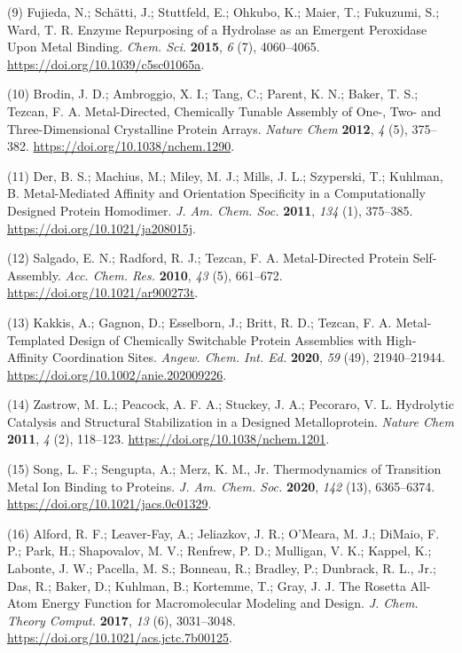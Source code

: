 \documentclass[ lineno,
  9pt]{elife}
\newenvironment{cslreferences}%
  {}%
  {\par}
\begin{document}
\begin{cslreferences}
\leavevmode\hypertarget{ref-78bpCEHk}{}%
(9) Fujieda, N.; Schätti, J.; Stuttfeld, E.; Ohkubo, K.; Maier, T.; Fukuzumi, S.; Ward, T. R. Enzyme Repurposing of a Hydrolase as an Emergent Peroxidase Upon Metal Binding. \emph{Chem. Sci.} \textbf{2015}, \emph{6} (7), 4060--4065. \url{https://doi.org/10.1039/c5sc01065a}.

\leavevmode\hypertarget{ref-ROLANnJl}{}%
(10) Brodin, J. D.; Ambroggio, X. I.; Tang, C.; Parent, K. N.; Baker, T. S.; Tezcan, F. A. Metal-Directed, Chemically Tunable Assembly of One-, Two- and Three-Dimensional Crystalline Protein Arrays. \emph{Nature Chem} \textbf{2012}, \emph{4} (5), 375--382. \url{https://doi.org/10.1038/nchem.1290}.

\leavevmode\hypertarget{ref-Lj2sbjzc}{}%
(11) Der, B. S.; Machius, M.; Miley, M. J.; Mills, J. L.; Szyperski, T.; Kuhlman, B. Metal-Mediated Affinity and Orientation Specificity in a Computationally Designed Protein Homodimer. \emph{J. Am. Chem. Soc.} \textbf{2011}, \emph{134} (1), 375--385. \url{https://doi.org/10.1021/ja208015j}.

\leavevmode\hypertarget{ref-17JMFzNJo}{}%
(12) Salgado, E. N.; Radford, R. J.; Tezcan, F. A. Metal-Directed Protein Self-Assembly. \emph{Acc. Chem. Res.} \textbf{2010}, \emph{43} (5), 661--672. \url{https://doi.org/10.1021/ar900273t}.

\leavevmode\hypertarget{ref-io987fKE}{}%
(13) Kakkis, A.; Gagnon, D.; Esselborn, J.; Britt, R. D.; Tezcan, F. A. Metal‐Templated Design of Chemically Switchable Protein Assemblies with High‐Affinity Coordination Sites. \emph{Angew. Chem. Int. Ed.} \textbf{2020}, \emph{59} (49), 21940--21944. \url{https://doi.org/10.1002/anie.202009226}.

\leavevmode\hypertarget{ref-JXKFLH3I}{}%
(14) Zastrow, M. L.; Peacock, A. F. A.; Stuckey, J. A.; Pecoraro, V. L. Hydrolytic Catalysis and Structural Stabilization in a Designed Metalloprotein. \emph{Nature Chem} \textbf{2011}, \emph{4} (2), 118--123. \url{https://doi.org/10.1038/nchem.1201}.

\leavevmode\hypertarget{ref-1FR3e6DyA}{}%
(15) Song, L. F.; Sengupta, A.; Merz, K. M., Jr. Thermodynamics of Transition Metal Ion Binding to Proteins. \emph{J. Am. Chem. Soc.} \textbf{2020}, \emph{142} (13), 6365--6374. \url{https://doi.org/10.1021/jacs.0c01329}.

\leavevmode\hypertarget{ref-1uPiiMnD}{}%
(16) Alford, R. F.; Leaver-Fay, A.; Jeliazkov, J. R.; O'Meara, M. J.; DiMaio, F. P.; Park, H.; Shapovalov, M. V.; Renfrew, P. D.; Mulligan, V. K.; Kappel, K.; Labonte, J. W.; Pacella, M. S.; Bonneau, R.; Bradley, P.; Dunbrack, R. L., Jr.; Das, R.; Baker, D.; Kuhlman, B.; Kortemme, T.; Gray, J. J. The Rosetta All-Atom Energy Function for Macromolecular Modeling and Design. \emph{J. Chem. Theory Comput.} \textbf{2017}, \emph{13} (6), 3031--3048. \url{https://doi.org/10.1021/acs.jctc.7b00125}.


\end{cslreferences}
\end{document}
